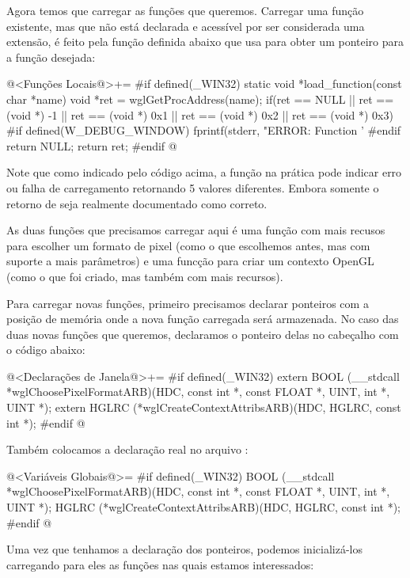 Agora temos que carregar as funções que queremos. Carregar uma função
existente, mas que não está declarada e acessível por ser considerada
uma extensão, é feito pela função definida abaixo que usa
 para obter um ponteiro para a função desejada:

\iniciocodigo
@<Funções Locais@>+=
#if defined(_WIN32)
static void *load_function(const char *name){
  void *ret = wglGetProcAddress(name);
  if(ret == NULL || ret == (void *) -1 || ret == (void *) 0x1 ||
     ret == (void *) 0x2 || ret == (void *) 0x3){
#if defined(W_DEBUG_WINDOW)
    fprintf(stderr, "ERROR: Function '%
#endif
    return NULL;
  }
  return ret;
}
#endif
@
\fimcodigo

Note que como indicado pelo código acima, a
função  na prática pode indicar erro ou
falha de carregamento retornando 5 valores diferentes. Embora somente
o retorno de  seja realmente documentado como
correto.

As duas funções que precisamos carregar aqui é uma função com mais
recusos para escolher um formato de pixel (como o que escolhemos
antes, mas com suporte a mais parâmetros) e uma funcção para criar um
contexto OpenGL (como o que foi criado, mas também com mais recursos).

Para carregar novas funções, primeiro precisamos declarar ponteiros
com a posição de memória onde a nova função carregada será
armazenada. No caso das duas novas funções que queremos, declaramos o
ponteiro delas no cabeçalho  com o código abaixo:

\iniciocodigo
@<Declarações de Janela@>+=
#if defined(_WIN32)
extern BOOL (__stdcall *wglChoosePixelFormatARB)(HDC, const int *, const FLOAT *,
                                                 UINT, int *, UINT *);
extern HGLRC (*wglCreateContextAttribsARB)(HDC, HGLRC, const int *);
#endif
@
\fimcodigo

Também colocamos a declaração real no arquivo :

\iniciocodigo
@<Variáveis Globais@>=
#if defined(_WIN32)
BOOL (__stdcall *wglChoosePixelFormatARB)(HDC, const int *, const FLOAT *, UINT,
                                          int *, UINT *);
HGLRC (*wglCreateContextAttribsARB)(HDC, HGLRC, const int *);
#endif
@
\fimcodigo

Uma vez que tenhamos a declaração dos ponteiros, podemos
inicializá-los carregando para eles as funções nas quais estamos
interessados:

